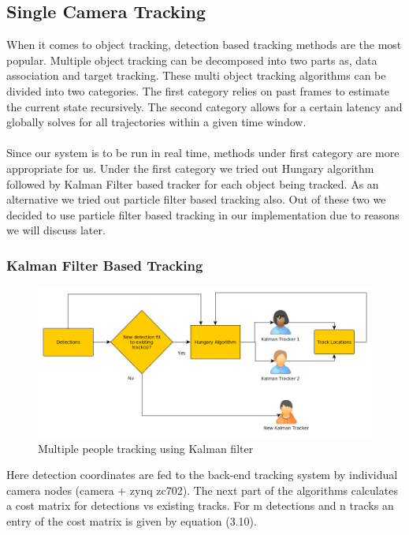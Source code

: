\documentclass[12pt,a4paper]{report}
\begin{document}
\subsection{Single Camera Tracking}
When it comes to object tracking, detection based tracking methods are the most popular. Multiple object tracking can be decomposed into two parts as, data association and target tracking. These multi object tracking algorithms can be divided into two categories. The first category relies on past frames to estimate the current state recursively. The second category allows for a certain latency and globally solves for all trajectories within a given time window. \\\\
Since our system is to be run in real time, methods under first category are more appropriate for us. Under the first category we tried out Hungary algorithm followed by Kalman Filter based tracker for each object being tracked. As an alternative we tried out particle filter based tracking also. Out of these two we decided to use particle filter based tracking in our implementation due to reasons we will discuss later. 

\subsubsection{Kalman Filter Based Tracking}

\begin{figure}[H]
\includegraphics[width=\textwidth]{kalman_hungary_tracker.png}
\centering
\caption{Multiple people tracking using Kalman filter}
\label{flask}
\end{figure}
Here detection coordinates are fed to the back-end tracking system by individual camera nodes (camera + zynq zc702). The next part of the algorithms calculates a cost matrix for detections vs existing tracks. For m detections and n tracks an entry of the cost matrix is given by equation (3.10).
\end{document}

